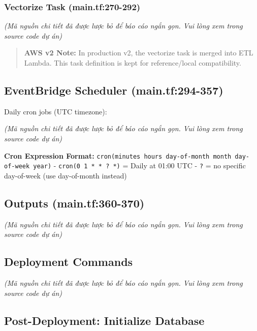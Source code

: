 \hypertarget{vectorize-task-main.tf270-292}{%
\subsubsection{Vectorize Task
(main.tf:270-292)}}

\emph{(Mã nguồn chi tiết đã được lược bỏ để báo cáo ngắn gọn. Vui lòng
xem trong source code dự án)}

\begin{quote}
\textbf{AWS v2 Note:} In production v2, the vectorize task is merged
into ETL Lambda. This task definition is kept for reference/local
compatibility.
\end{quote}

\hypertarget{eventbridge-scheduler-main.tf294-357}{%
\subsection{EventBridge Scheduler
(main.tf:294-357)}}

Daily cron jobs (UTC timezone):

\emph{(Mã nguồn chi tiết đã được lược bỏ để báo cáo ngắn gọn. Vui lòng
xem trong source code dự án)}

\textbf{Cron Expression Format:}
\texttt{cron(minutes\ hours\ day-of-month\ month\ day-of-week\ year)} -
\texttt{cron(0\ 1\ *\ *\ ?\ *)} = Daily at 01:00 UTC - \texttt{?} = no
specific day-of-week (use day-of-month instead)

\hypertarget{outputs-main.tf360-370}{%
\subsection{Outputs (main.tf:360-370)}}

\emph{(Mã nguồn chi tiết đã được lược bỏ để báo cáo ngắn gọn. Vui lòng
xem trong source code dự án)}

\hypertarget{deployment-commands}{%
\subsection{Deployment Commands}}

\emph{(Mã nguồn chi tiết đã được lược bỏ để báo cáo ngắn gọn. Vui lòng
xem trong source code dự án)}

\hypertarget{post-deployment-initialize-database}{%
\subsection{Post-Deployment: Initialize
Database}}

